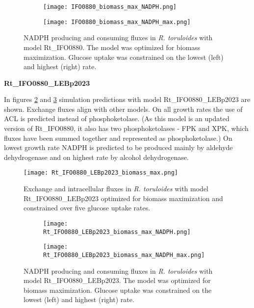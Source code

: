 \begin{figure}[h!]
    \centering
    \begin{subfigure}[h!]{0.49\textwidth}
        \centering
        \texttt{[image: IFO0880\_biomass\_max\_NADPH.png]}
    \end{subfigure}
    \hfill
    \begin{subfigure}[h!]{0.49\textwidth}
        \centering
        \texttt{[image: IFO0880\_biomass\_max\_NADPH\_max.png]}
    \end{subfigure}
    \caption{NADPH producing and consuming fluxes in \textit{R. toruloides} with model Rt\_IFO0880. The model was optimized for biomass maximization. 
     Glucose uptake was constrained on the lowest (left) and highest (right) rate.}
    \label{fig:IFO0880_biomass_max_NADPH_max}
\end{figure}


\textbf{Rt\_IFO0880\_LEBp2023}

In figures \ref{fig:Rt_IFO0880_LEBp2023_biomass_max} and \ref{fig:Rt_IFO0880_LEBp2023_biomass_max_NADPH_max} 
simulation predictions with model Rt\_IFO0880\_LEBp2023 are shown.
Exchange fluxes align with other models. On all growth rates the use of ACL is predicted instead of phosphoketolase. 
(As this model is an updated version of Rt\_IFO0880, it also has two phosphoketolases - FPK and XPK, which fluxes
have been summed together and represented as phosphoketolase.) 
On lowest growth rate NADPH is predicted to be produced mainly by aldehyde dehydrogenase and on highest rate by alcohol dehydrogenase.


\begin{figure}[h!]
    \centering
    \texttt{[image: Rt\_IFO0880\_LEBp2023\_biomass\_max.png]}
    \caption{Exchange and intracellular fluxes in \textit{R. toruloides} with model Rt\_IFO0880\_LEBp2023 optimized for biomass maximization 
    and constrained over five glucose uptake rates.}
    \label{fig:Rt_IFO0880_LEBp2023_biomass_max}
\end{figure}

\begin{figure}[h!]
    \centering
    \begin{subfigure}[h!]{0.49\textwidth}
        \centering
        \texttt{[image: Rt\_IFO0880\_LEBp2023\_biomass\_max\_NADPH.png]}
    \end{subfigure}
    \hfill
    \begin{subfigure}[h!]{0.49\textwidth}
        \centering
        \texttt{[image: Rt\_IFO0880\_LEBp2023\_biomass\_max\_NADPH\_max.png]}
    \end{subfigure}
    \caption{NADPH producing and consuming fluxes in \textit{R. toruloides} with model Rt\_IFO0880\_LEBp2023. The model was optimized for biomass maximization. 
    Glucose uptake was constrained on the lowest (left) and highest (right) rate.}
    \label{fig:Rt_IFO0880_LEBp2023_biomass_max_NADPH_max}
\end{figure}



